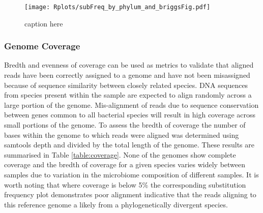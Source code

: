 \documentclass[12pt, a4paper]{article}
\begin{document}
\begin{figure}[ht!]
	\centering
	\texttt{[image: Rplots/subFreq\_by\_phylum\_and\_briggsFig.pdf]}
	\small\caption{caption here}\label{fig:misincoprPhylumFig}
\end{figure}
\clearpage

\subsubsection{Genome Coverage}\label{sssec:genomeCoverage}

Bredth and evenness of coverage can be used as metrics to validate that aligned reads have been correctly assigned to a genome and have not been misassigned because of sequence similarity between closely related species. 
DNA sequences from species present within the sample are expected to align randomly across a large portion of the genome. 
Mis-alignment of reads due to sequence conservation between genes common to all bacterial species will result in high coverage across small portions of the genome.
To assess the bredth of coverage the number of bases within the genome to which reads were aligned was determined using samtools depth and divided by the total length of the genome. 
These results are summarised in Table \ref{table:coverage}.
None of the genomes show complete coverage and the bredth of coverage for a given species varies widely between samples due to variation in the microbiome composition of different samples.
It is worth noting that where coverage is below 5\% the corresponding substitution frequency plot demonstrates poor alignment indicative that the reads aligning to this reference genome a likely from a phylogenetically divergent species.
\end{document}
